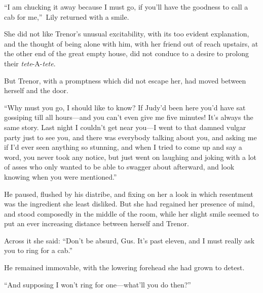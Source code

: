 \documentclass[12pt,a4paper]{book}
\begin{document}
``I am chucking it away because I must go, if you'll have the
goodness to call a cab for me,''\ Lily returned with a smile.





She did not like Trenor's unusual excitability, with its too
evident explanation, and the thought of being alone with him,
with her friend out of reach upstairs, at the other end of the
great empty house, did not conduce to a desire to prolong their
\textit{tete}-A-\textit{tete}.





But Trenor, with a promptness which did not escape her, had moved
between herself and the door.





``Why must you go, I should like to know? If Judy'd been here
you'd have sat gossiping till all hours---and you can't even give
me five minutes! It's always the same story. Last night I
couldn't get near you---I went to that damned vulgar party just to
see you, and there was everybody talking about you, and asking me
if I'd ever seen anything so stunning, and when I tried to come
up and say a word, you never took any notice, but just went on
laughing and joking with a lot of asses who only wanted to be
able to swagger about afterward, and look knowing when you were
mentioned.''





He paused, flushed by his diatribe, and fixing on her a look in
which resentment was the ingredient she least disliked. But she
had regained her presence of mind, and stood composedly in the
middle of the room, while her slight smile seemed to put an ever
increasing distance between herself and Trenor.





Across it she said: ``Don't be absurd, Gus. It's past eleven, and
I must really ask you to ring for a cab.''





He remained immovable, with the lowering forehead she had grown
to detest.





``And supposing I won't ring for one---what'll you do then?''
\end{document}
